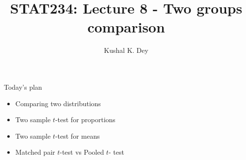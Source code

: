 \documentclass{beamer}\usepackage[]{graphicx}\usepackage[]{color}
\title{STAT234: Lecture 8 - Two groups comparison}
\author{Kushal K. Dey}
\date{}
\begin{document}





\begin{frame}{}
\maketitle
\end{frame}


\begin{frame}{Today's plan}

\begin{itemize}
\item Comparing two distributions \pause
\item Two sample $t$-test for proportions \pause 
\item Two sample $t$-test for means \pause
\item Matched pair $t$-test vs Pooled $t$- test \pause
\end{itemize}
\end{frame}
\end{document}
